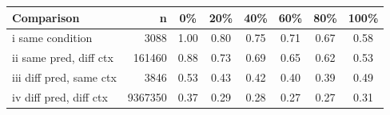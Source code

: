 \begin{tabular}{lrcccccc}
\toprule
Comparison & n & 0\% & 20\% & 40\% & 60\% & 80\% & 100\% \\
\midrule
i   same condition & 3088 & 1.00 & 0.80 & 0.75 & 0.71 & 0.67 & 0.58 \\
ii  same pred, diff ctx & 161460 & 0.88 & 0.73 & 0.69 & 0.65 & 0.62 & 0.53 \\
iii diff pred, same ctx & 3846 & 0.53 & 0.43 & 0.42 & 0.40 & 0.39 & 0.49 \\
iv  diff pred, diff ctx & 9367350 & 0.37 & 0.29 & 0.28 & 0.27 & 0.27 & 0.31 \\
\bottomrule
\end{tabular}
